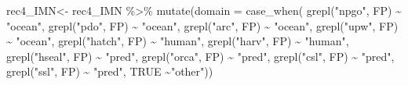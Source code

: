\documentclass[
]{article}
\newenvironment{Shaded}{\begin{snugshade}}{\end{snugshade}}
\newcommand{\AttributeTok}[1]{\textcolor[rgb]{0.77,0.63,0.00}{#1}}
\newcommand{\ConstantTok}[1]{\textcolor[rgb]{0.00,0.00,0.00}{#1}}
\newcommand{\FunctionTok}[1]{\textcolor[rgb]{0.00,0.00,0.00}{#1}}
\newcommand{\NormalTok}[1]{#1}
\newcommand{\OtherTok}[1]{\textcolor[rgb]{0.56,0.35,0.01}{#1}}
\newcommand{\SpecialCharTok}[1]{\textcolor[rgb]{0.00,0.00,0.00}{#1}}
\newcommand{\StringTok}[1]{\textcolor[rgb]{0.31,0.60,0.02}{#1}}
\begin{document}
\begin{Shaded}
\begin{Highlighting}[]
\NormalTok{rec4\_IMN}\OtherTok{\textless{}{-}}\NormalTok{  rec4\_IMN }\SpecialCharTok{\%\textgreater{}\%} 
  \FunctionTok{mutate}\NormalTok{(}\AttributeTok{domain =} \FunctionTok{case\_when}\NormalTok{(}
    \FunctionTok{grepl}\NormalTok{(}\StringTok{"npgo"}\NormalTok{, FP) }\SpecialCharTok{\textasciitilde{}} \StringTok{"ocean"}\NormalTok{,}
    \FunctionTok{grepl}\NormalTok{(}\StringTok{"pdo"}\NormalTok{, FP) }\SpecialCharTok{\textasciitilde{}} \StringTok{"ocean"}\NormalTok{,}
    \FunctionTok{grepl}\NormalTok{(}\StringTok{"arc"}\NormalTok{, FP) }\SpecialCharTok{\textasciitilde{}} \StringTok{"ocean"}\NormalTok{,}
    \FunctionTok{grepl}\NormalTok{(}\StringTok{"upw"}\NormalTok{, FP) }\SpecialCharTok{\textasciitilde{}} \StringTok{"ocean"}\NormalTok{, }
    \FunctionTok{grepl}\NormalTok{(}\StringTok{"hatch"}\NormalTok{, FP) }\SpecialCharTok{\textasciitilde{}} \StringTok{"human"}\NormalTok{,}
    \FunctionTok{grepl}\NormalTok{(}\StringTok{"harv"}\NormalTok{, FP) }\SpecialCharTok{\textasciitilde{}} \StringTok{"human"}\NormalTok{,}
    \FunctionTok{grepl}\NormalTok{(}\StringTok{"hseal"}\NormalTok{, FP) }\SpecialCharTok{\textasciitilde{}} \StringTok{"pred"}\NormalTok{,}
    \FunctionTok{grepl}\NormalTok{(}\StringTok{"orca"}\NormalTok{, FP) }\SpecialCharTok{\textasciitilde{}} \StringTok{"pred"}\NormalTok{,}
    \FunctionTok{grepl}\NormalTok{(}\StringTok{"csl"}\NormalTok{, FP) }\SpecialCharTok{\textasciitilde{}} \StringTok{"pred"}\NormalTok{, }
    \FunctionTok{grepl}\NormalTok{(}\StringTok{"ssl"}\NormalTok{, FP) }\SpecialCharTok{\textasciitilde{}} \StringTok{"pred"}\NormalTok{, }
    \ConstantTok{TRUE} \SpecialCharTok{\textasciitilde{}}\StringTok{"other"}\NormalTok{))}


\end{Highlighting}
\end{Shaded}
\end{document}
